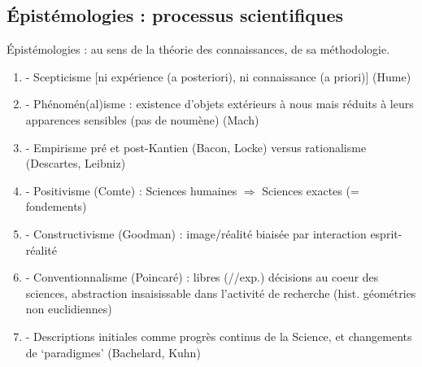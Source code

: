 \subsection{Épistémologies : processus scientifiques}
{\footnotesize Épistémologies : au sens de la théorie des connaissances, de sa méthodologie.}

\begin{enumerate}[label=\Alph*]
  \item - Scepticisme [ni expérience (a posteriori), ni connaissance (a priori)] (Hume)
  \item - Phénomén(al)isme : existence d’objets extérieurs à nous mais réduits
à leurs apparences sensibles (pas de noumène) (Mach)
  \item - Empirisme pré et post-Kantien (Bacon, Locke)
versus rationalisme (Descartes, Leibniz)
  \item - Positivisme (Comte) : Sciences humaines $\Rightarrow$ Sciences exactes (= fondements)
  \item - Constructivisme (Goodman) : image/réalité biaisée par interaction esprit-réalité
  \item - Conventionnalisme (Poincaré) : libres (//exp.) décisions au coeur des sciences,
abstraction insaisissable dans l’activité de recherche
(hist. géométries non euclidiennes)
  \item - Descriptions initiales comme progrès continus de la Science,
et changements de ‘paradigmes’ (Bachelard, Kuhn)
\end{enumerate}
